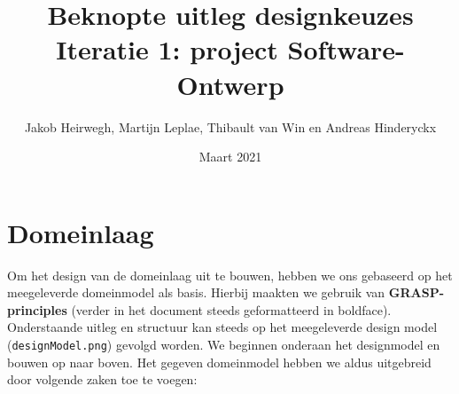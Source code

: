 \documentclass[12pt]{article}
\title{Beknopte uitleg designkeuzes\\ Iteratie 1: project Software-Ontwerp}
\author{Jakob Heirwegh, Martijn Leplae, Thibault van Win en Andreas Hinderyckx}
\date{Maart 2021}
\begin{document}
\maketitle

\newpage

\section{Domeinlaag}
Om het design van de domeinlaag uit te bouwen, hebben we ons gebaseerd op het meegeleverde domeinmodel als basis. Hierbij maakten we gebruik van \textbf{GRASP-principles} (verder in het document steeds geformatteerd in boldface). Onderstaande uitleg en structuur kan steeds op het meegeleverde design model (\texttt{designModel.png}) gevolgd worden. We beginnen onderaan het designmodel en bouwen op naar boven. Het gegeven domeinmodel hebben we aldus uitgebreid door volgende zaken toe te voegen:
\end{document}
